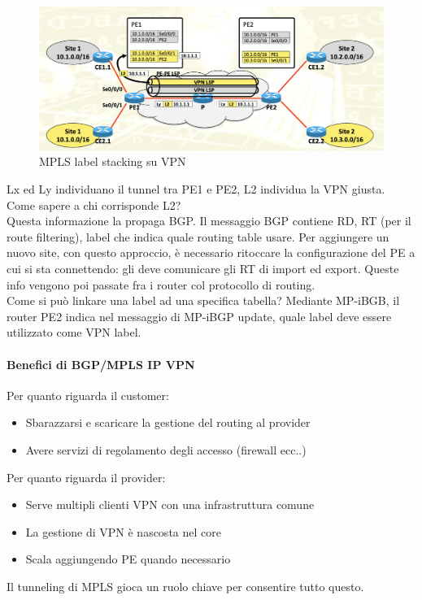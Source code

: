 \documentclass{article}
\begin{document}
\begin{figure}[H]
    \centering
    \includegraphics[scale=0.5]{figures/vpn label stacking.png}
    \caption{MPLS label stacking su VPN}
\end{figure}
\noindent Lx ed Ly individuano il tunnel tra PE1 e PE2, L2 individua la VPN giusta. Come sapere a chi corrisponde L2? \\ Questa informazione la propaga BGP. Il messaggio BGP contiene RD, RT (per il route filtering), label che indica quale routing table usare. Per aggiungere un nuovo site, con questo approccio, è necessario ritoccare la configurazione del PE a cui si sta connettendo: gli deve comunicare gli RT di import ed export. Queste info vengono poi passate fra i router col protocollo di routing. \\ Come si può linkare una label ad una specifica tabella? Mediante MP-iBGB, il router PE2 indica nel messaggio di MP-iBGP update, quale label deve essere utilizzato come VPN label.

\paragraph{Benefici di BGP/MPLS IP VPN} Per quanto riguarda il customer:
\begin{itemize}
    \item Sbarazzarsi e scaricare la gestione del routing al provider
    \item Avere servizi di regolamento degli accesso (firewall ecc..)
\end{itemize}
Per quanto riguarda il provider:
\begin{itemize}
    \item Serve multipli clienti VPN con una infrastruttura comune
    \item La gestione di VPN è nascosta nel core
    \item Scala aggiungendo PE quando necessario
\end{itemize}
Il tunneling di MPLS gioca un ruolo chiave per consentire tutto questo.
\end{document}
